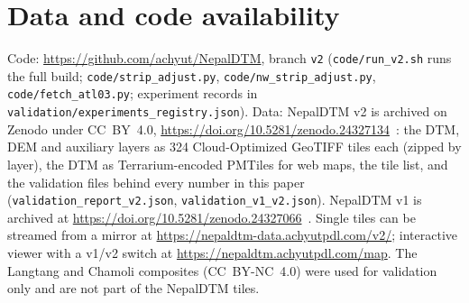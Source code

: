 \documentclass[11pt]{article}
\begin{document}
\section{Data and code availability}
Code: \url{https://github.com/achyut/NepalDTM}, branch \texttt{v2} (\texttt{code/run\_v2.sh} runs the full build;
\texttt{code/strip\_adjust.py}, \texttt{code/nw\_strip\_adjust.py}, \texttt{code/fetch\_atl03.py}; experiment records in
\texttt{validation/experiments\_registry.json}).
Data: NepalDTM v2 is archived on Zenodo under CC~BY~4.0,
\url{https://doi.org/10.5281/zenodo.24327134}~\citep{paudel2026nepaldtmv2data}: the DTM, DEM and auxiliary layers as
324 Cloud-Optimized GeoTIFF tiles each (zipped by layer), the DTM as Terrarium-encoded PMTiles for web maps, the tile list,
and the validation files behind every number in this paper (\texttt{validation\_report\_v2.json},
\texttt{validation\_v1\_v2.json}).
NepalDTM v1 is archived at \url{https://doi.org/10.5281/zenodo.24327066}~\citep{paudel2026nepaldtmv1data}.
Single tiles can be streamed from a mirror at \url{https://nepaldtm-data.achyutpdl.com/v2/}; interactive viewer with a
v1/v2 switch at \url{https://nepaldtm.achyutpdl.com/map}.
The Langtang and Chamoli composites (CC~BY-NC~4.0) were used for validation only and are not part of the NepalDTM tiles.

\FloatBarrier


\end{document}
